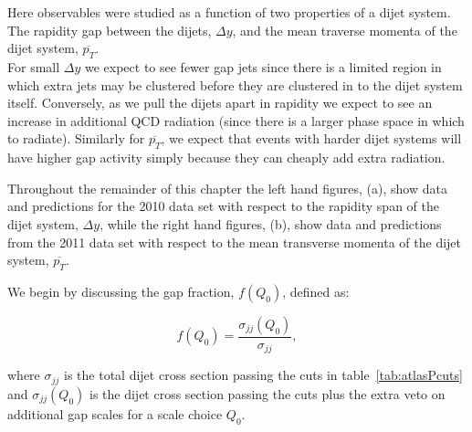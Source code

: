 	Here observables were studied
	as a function of two properties of a dijet system.  The rapidity gap between the dijets,
	$\Delta y$, and the mean traverse momenta of the dijet system, $\overline{p_T}$.\\
	For small $\Delta y$ we expect to see fewer gap jets since there is
	a limited region in which extra jets may be clustered before they are clustered in
	to the dijet system itself.   Conversely, as we pull the dijets apart in rapidity
	we expect to see an increase in additional QCD radiation (since there is a larger
	phase space in which to radiate).  Similarly for $\overline{p_T}$, we expect that
	events with harder dijet systems will have higher gap activity simply because they
	can cheaply add extra radiation.

	Throughout the remainder of this chapter the  left hand figures, (a), show data and
	predictions for the 2010 data set with respect to the rapidity span of the dijet
	system, $\Delta y$, while the right hand figures, (b), show data and predictions from the
	2011 data set with respect to the mean transverse momenta of the dijet system,
	$\overline{p_T}$.

	We begin by discussing the gap fraction, $f(Q_0)$, defined as:

	\begin{equation}
		f(Q_0) = \frac{\sigma_{jj}(Q_0)}{\sigma_{jj}},
	\end{equation}

	where $\sigma_{jj}$ is the total dijet cross section passing the cuts in
	table~\ref{tab:atlasPcuts} and $\sigma_{jj}(Q_0)$ is the dijet cross section passing
	the cuts plus the extra veto on additional gap scales for a scale choice $Q_0$.

